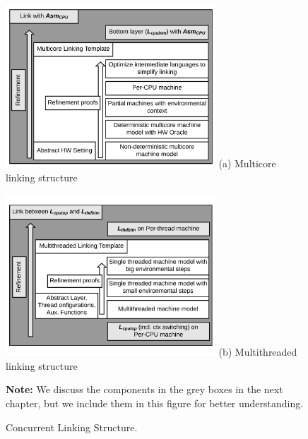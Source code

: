 \begin{figure}
\begin{center}
\includegraphics[width=0.7\textwidth]{figs/conlink/cpu_linking_structure}\newline
(a) Multicore linking structure
\end{center}
\begin{center}
\includegraphics[width=0.7\textwidth]{figs/conlink/thread_linking_structure}\newline
(b) Multithreaded linking structure
\end{center}
\textbf{Note:} We discuss the components in the grey boxes  in the next chapter, but we include them in this figure for better understanding.
\caption{Concurrent Linking Structure.}
\label{fig:chapter:conlink:concurrent-linking-structure}
\end{figure}

